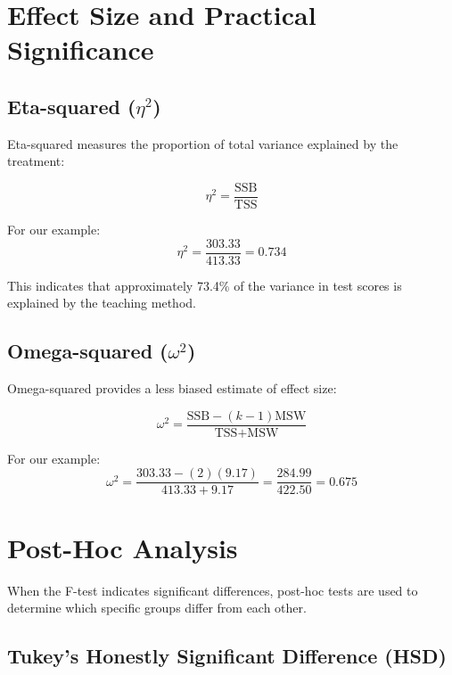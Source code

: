 \documentclass[twoside]{book}
\begin{document}
\section{Effect Size and Practical Significance}

\subsection{Eta-squared ($\eta^2$)}

Eta-squared measures the proportion of total variance explained by the treatment:

\begin{equation}
\eta^2 = \frac{\text{SSB}}{\text{TSS}}
\end{equation}

For our example:
\begin{equation}
\eta^2 = \frac{303.33}{413.33} = 0.734
\end{equation}

This indicates that approximately 73.4\% of the variance in test scores is explained by the teaching method.

\subsection{Omega-squared ($\omega^2$)}

Omega-squared provides a less biased estimate of effect size:

\begin{equation}
\omega^2 = \frac{\text{SSB} - (k-1)\text{MSW}}{\text{TSS} + \text{MSW}}
\end{equation}

For our example:
\begin{equation}
\omega^2 = \frac{303.33 - (2)(9.17)}{413.33 + 9.17} = \frac{284.99}{422.50} = 0.675
\end{equation}

\section{Post-Hoc Analysis}

When the F-test indicates significant differences, post-hoc tests are used to determine which specific groups differ from each other.

\subsection{Tukey's Honestly Significant Difference (HSD)}
\end{document}
